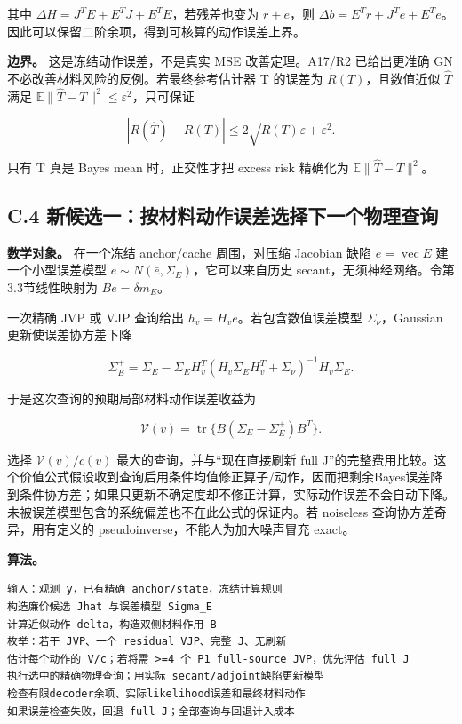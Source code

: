 \documentclass[
  11pt,
  a4paper,
]{article}
\begin{document}
其中 \(\Delta H=J^TE+E^TJ+E^TE\)，若残差也变为 \(r+e\)，则
\(\Delta b=E^Tr+J^Te+E^Te\)。因此可以保留二阶余项，得到可核算的动作误差上界。

\textbf{边界。} 这是冻结动作误差，不是真实 MSE 改善定理。A17/R2
已给出更准确 GN 不必改善材料风险的反例。若最终参考估计器 T 的误差为
\(R(T)\)，且数值近似 \(\widehat T\) 满足
\(\mathbb{E}\|\widehat T-T\|^2\le\varepsilon^2\)，只可保证

\[
|R(\widehat T)-R(T)|\le2\sqrt{R(T)}\varepsilon+\varepsilon^2.
\]

只有 T 真是 Bayes mean 时，正交性才把 excess risk 精确化为
\(\mathbb{E}\|\widehat T-T\|^2\)。

\hypertarget{c.4-ux65b0ux5019ux9009ux4e00ux6309ux6750ux6599ux52a8ux4f5cux8befux5deeux9009ux62e9ux4e0bux4e00ux4e2aux7269ux7406ux67e5ux8be2}{%
\subsection{C.4
新候选一：按材料动作误差选择下一个物理查询}\label{c.4-ux65b0ux5019ux9009ux4e00ux6309ux6750ux6599ux52a8ux4f5cux8befux5deeux9009ux62e9ux4e0bux4e00ux4e2aux7269ux7406ux67e5ux8be2}}

\textbf{数学对象。} 在一个冻结 anchor/cache 周围，对压缩 Jacobian 缺陷
\(e=\operatorname{vec}E\) 建一个小型误差模型
\(e\sim N(\bar e,\Sigma_E)\)，它可以来自历史
secant，无须神经网络。令第3.3节线性映射为 \(B e=\delta m_E\)。

一次精确 JVP 或 VJP 查询给出 \(h_v=H_v e\)。若包含数值误差模型
\(\Sigma_\nu\)，Gaussian 更新使误差协方差下降

\[
\Sigma_E^+=\Sigma_E-\Sigma_EH_v^T(H_v\Sigma_EH_v^T+\Sigma_\nu)^{-1}H_v\Sigma_E.
\]

于是这次查询的预期局部材料动作误差收益为

\[
\mathcal{V}(v)=\operatorname{tr}\{B(\Sigma_E-\Sigma_E^+)B^T\}.
\]

选择 \(\mathcal{V}(v)/c(v)\) 最大的查询，并与``现在直接刷新 full
J''的完整费用比较。这个价值公式假设收到查询后用条件均值修正算子/动作，因而把剩余Bayes误差降到条件协方差；如果只更新不确定度却不修正计算，实际动作误差不会自动下降。未被误差模型包含的系统偏差也不在此公式的保证内。若
noiseless 查询协方差奇异，用有定义的 pseudoinverse，不能人为加大噪声冒充
exact。

\textbf{算法。}

\begin{verbatim}
输入：观测 y，已有精确 anchor/state，冻结计算规则
构造廉价候选 Jhat 与误差模型 Sigma_E
计算近似动作 delta，构造双侧材料作用 B
枚举：若干 JVP、一个 residual VJP、完整 J、无刷新
估计每个动作的 V/c；若将需 >=4 个 P1 full-source JVP，优先评估 full J
执行选中的精确物理查询；用实际 secant/adjoint缺陷更新模型
检查有限decoder余项、实际likelihood误差和最终材料动作
如果误差检查失败，回退 full J；全部查询与回退计入成本
\end{verbatim}
\end{document}
